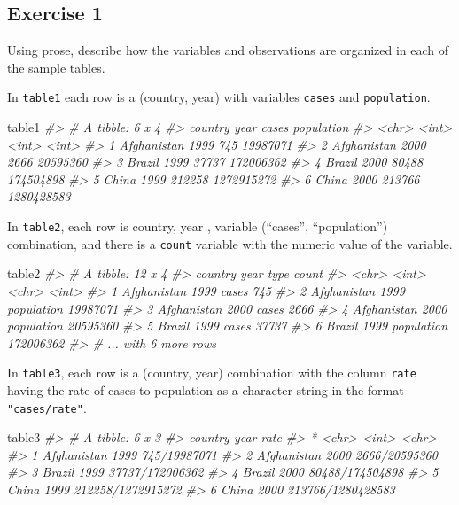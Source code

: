 \documentclass[]{book}
\newenvironment{Shaded}{\begin{snugshade}}{\end{snugshade}}
\newcommand{\CommentTok}[1]{\textcolor[rgb]{0.56,0.35,0.01}{\textit{#1}}}
\newcommand{\NormalTok}[1]{#1}
\theoremstyle{plain}
\theoremstyle{remark}
\theoremstyle{definition}
\theoremstyle{definition}
\theoremstyle{definition}
\theoremstyle{remark}
\begin{document}
\hypertarget{exercise-1-21}{%
\subsection{Exercise 1}\label{exercise-1-21}}

Using prose, describe how the variables and observations are organized
in each of the sample tables.

In \texttt{table1} each row is a (country, year) with variables
\texttt{cases} and \texttt{population}.

\begin{Shaded}
\begin{Highlighting}[]
\NormalTok{table1}
\CommentTok{#> # A tibble: 6 x 4}
\CommentTok{#>   country      year  cases population}
\CommentTok{#>   <chr>       <int>  <int>      <int>}
\CommentTok{#> 1 Afghanistan  1999    745   19987071}
\CommentTok{#> 2 Afghanistan  2000   2666   20595360}
\CommentTok{#> 3 Brazil       1999  37737  172006362}
\CommentTok{#> 4 Brazil       2000  80488  174504898}
\CommentTok{#> 5 China        1999 212258 1272915272}
\CommentTok{#> 6 China        2000 213766 1280428583}
\end{Highlighting}
\end{Shaded}

In \texttt{table2}, each row is country, year , variable (``cases'',
``population'') combination, and there is a \texttt{count} variable with
the numeric value of the variable.

\begin{Shaded}
\begin{Highlighting}[]
\NormalTok{table2}
\CommentTok{#> # A tibble: 12 x 4}
\CommentTok{#>   country      year type           count}
\CommentTok{#>   <chr>       <int> <chr>          <int>}
\CommentTok{#> 1 Afghanistan  1999 cases            745}
\CommentTok{#> 2 Afghanistan  1999 population  19987071}
\CommentTok{#> 3 Afghanistan  2000 cases           2666}
\CommentTok{#> 4 Afghanistan  2000 population  20595360}
\CommentTok{#> 5 Brazil       1999 cases          37737}
\CommentTok{#> 6 Brazil       1999 population 172006362}
\CommentTok{#> # ... with 6 more rows}
\end{Highlighting}
\end{Shaded}

In \texttt{table3}, each row is a (country, year) combination with the
column \texttt{rate} having the rate of cases to population as a
character string in the format \texttt{"cases/rate"}.

\begin{Shaded}
\begin{Highlighting}[]
\NormalTok{table3}
\CommentTok{#> # A tibble: 6 x 3}
\CommentTok{#>   country      year rate             }
\CommentTok{#> * <chr>       <int> <chr>            }
\CommentTok{#> 1 Afghanistan  1999 745/19987071     }
\CommentTok{#> 2 Afghanistan  2000 2666/20595360    }
\CommentTok{#> 3 Brazil       1999 37737/172006362  }
\CommentTok{#> 4 Brazil       2000 80488/174504898  }
\CommentTok{#> 5 China        1999 212258/1272915272}
\CommentTok{#> 6 China        2000 213766/1280428583}
\end{Highlighting}
\end{Shaded}
\end{document}
